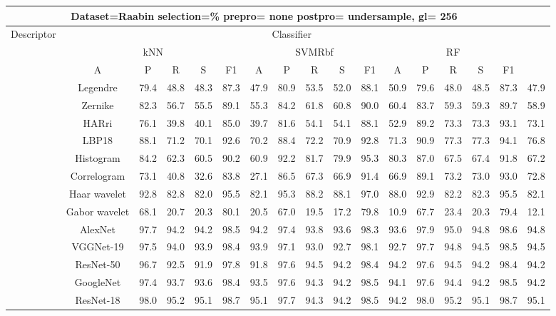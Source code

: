 \documentclass[12pt,italian]{article}
\begin{document}
\begin{tiny}
\begin{longtable}{lcccccccccccccccc}
\toprule
\multicolumn{16}{c}{Dataset=Raabin selection=\% prepro= none postpro= undersample, gl= 256} \\ 
\toprule
Descriptor & \multicolumn{15}{c}{Classifier} \\ 
& \multicolumn{5}{c}{kNN} & \multicolumn{5}{c}{SVMRbf} & \multicolumn{5}{c}{RF} \\ 
& A & P & R & S & F1 & A & P & R & S & F1 & A & P & R & S & F1 \\ 
\midrule
& Legendre & 79.4 & 48.8 & 48.3 & 87.3 & 47.9 & 80.9 & 53.5 & 52.0 & 88.1 & 50.9 & 79.6 & 48.0 & 48.5 & 87.3 & 47.9 \\ 
& Zernike & 82.3 & 56.7 & 55.5 & 89.1 & 55.3 & 84.2 & 61.8 & 60.8 & 90.0 & 60.4 & 83.7 & 59.3 & 59.3 & 89.7 & 58.9 \\ 
& HARri & 76.1 & 39.8 & 40.1 & 85.0 & 39.7 & 81.6 & 54.1 & 54.1 & 88.1 & 52.9 & 89.2 & 73.3 & 73.3 & 93.1 & 73.1 \\ 
& LBP18 & 88.1 & 71.2 & 70.1 & 92.6 & 70.2 & 88.4 & 72.2 & 70.9 & 92.8 & 71.3 & 90.9 & 77.3 & 77.3 & 94.1 & 76.8 \\ 
& Histogram & 84.2 & 62.3 & 60.5 & 90.2 & 60.9 & 92.2 & 81.7 & 79.9 & 95.3 & 80.3 & 87.0 & 67.5 & 67.4 & 91.8 & 67.2 \\ 
& Correlogram & 73.1 & 40.8 & 32.6 & 83.8 & 27.1 & 86.5 & 67.3 & 66.9 & 91.4 & 66.9 & 89.1 & 73.2 & 73.0 & 93.0 & 72.8 \\ 
& Haar wavelet & 92.8 & 82.8 & 82.0 & 95.5 & 82.1 & 95.3 & 88.2 & 88.1 & 97.0 & 88.0 & 92.9 & 82.2 & 82.3 & 95.5 & 82.1 \\ 
& Gabor wavelet & 68.1 & 20.7 & 20.3 & 80.1 & 20.5 & 67.0 & 19.5 & 17.2 & 79.8 & 10.9 & 67.7 & 23.4 & 20.3 & 79.4 & 12.1 \\ 
& AlexNet & 97.7 & 94.2 & 94.2 & 98.5 & 94.2 & 97.4 & 93.8 & 93.6 & 98.3 & 93.6 & 97.9 & 95.0 & 94.8 & 98.6 & 94.8 \\ 
& VGGNet-19 & 97.5 & 94.0 & 93.9 & 98.4 & 93.9 & 97.1 & 93.0 & 92.7 & 98.1 & 92.7 & 97.7 & 94.8 & 94.5 & 98.5 & 94.5 \\ 
& ResNet-50 & 96.7 & 92.5 & 91.9 & 97.8 & 91.8 & 97.6 & 94.5 & 94.2 & 98.4 & 94.2 & 97.6 & 94.5 & 94.2 & 98.4 & 94.2 \\ 
& GoogleNet & 97.4 & 93.7 & 93.6 & 98.4 & 93.5 & 97.6 & 94.3 & 94.2 & 98.5 & 94.1 & 97.6 & 94.4 & 94.2 & 98.5 & 94.2 \\ 
& ResNet-18 & 98.0 & 95.2 & 95.1 & 98.7 & 95.1 & 97.7 & 94.3 & 94.2 & 98.5 & 94.2 & 98.0 & 95.2 & 95.1 & 98.7 & 95.1 \\ 

\end{longtable}
\end{tiny}
\end{document}
